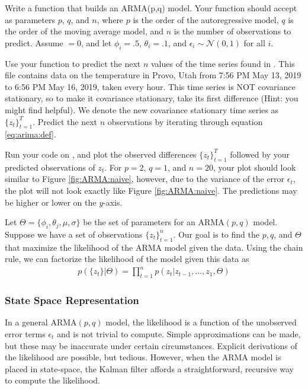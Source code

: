 \begin{problem}
Write a function  that builds an ARMA(p,q) model. 
Your function should accept as parameters $p$, $q$, and $n$, where $p$ is the order of the autoregressive model, $q$ is the order of the moving average model, and $n$ is the number of observations to predict.
Assume $ = 0$, and let $\phi_i=.5$, $\theta_i=.1$, and $\epsilon_i\sim\mathscr{N}(0,1)$ for all $i$.

Use your function to predict the next $n$ values of the time series found in .
This file contains data on the temperature in Provo, Utah from 7:56 PM May 13, 2019 to 6:56 PM May 16, 2019, taken every hour.
This time series is NOT covariance stationary, so to make it covariance stationary, take its first difference (Hint: you might find  helpful).
We denote the new covariance stationary time series as $\{z_t\}_{t=1}^T$.
Predict the next $n$ observations by iterating through equation \ref{eq:arima:def}.

Run your code on , and plot the observed differences $\{z_t\}_{t=1}^T$ followed by your predicted observations of $z_t$.
For $p=2$, $q=1$, and $n=20$, your plot should look similar to Figure \ref{fig:ARMA:naive}, however, due to the variance of the error $\epsilon_t$, the plot will not look exactly like Figure \ref{fig:ARMA:naive}.
The predictions may be higher or lower on the $y$-axis.
\label{prob:arma:naive}
\end{problem}

Let $\Theta = \{\phi_i, \theta_j, \mu, \sigma\}$ be the set of parameters
for an $\text{ARMA}(p,q)$ model.
Suppose we have a set of observations $\{z_t\}_{t=1}^n$.
Our goal is to find the $p,q$, and $\Theta$ that maximize the likelihood of the ARMA model given the data.
Using the chain rule, we can factorize the likelihood of the model given this data as
\begin{align}
    \label{eq:arma:factorized}
    p(\{z_t\} | \Theta) = \prod_{t=1}^{n} p(z_t | z_{t-1}, \ldots, z_{1},
    \Theta)
\end{align}

\subsubsection*{State Space Representation}

In a general $\text{ARMA}(p,q)$ model, the likelihood is a function of the
unobserved error terms $\epsilon_t$ and is not trivial to compute.
Simple approximations can be made, but these may be inaccurate under certain
circumstances.
Explicit derivations of the likelihood are possible, but
tedious.
However, when the $\text{ARMA}$ model is placed in state-space, the
Kalman filter affords a straightforward, recursive way to compute the
likelihood.

